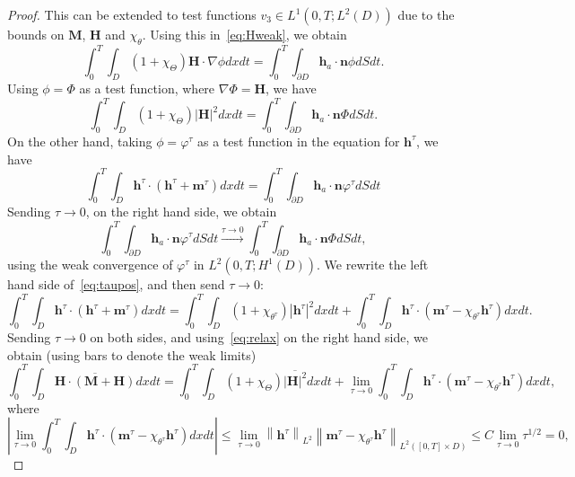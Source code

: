 \documentclass[10pt,letterpaper,twoside]{amsart}
\theoremstyle{definition}{\newtheorem{definition}[lemma]{Definition}}
\theoremstyle{note}{\newtheorem{claim}{Claim}[section]
\newtheorem*{claim*}{Claim}}
\numberwithin{equation}{section}
\newcommand{\dom}{D}
\newcommand{\norm}[1]{\left\| #1 \right\|}
\newcommand{\Grad}{\nabla}
\newcommand{\Bm}{\mathbf{M}}
\newcommand{\Bh}{\mathbf{H}}
\newcommand{\bh}{\mathbf{h}}
\newcommand{\bmt}{\mathbf{m}^{\tau}}
\newcommand{\bht}{\mathbf{h}^{\tau}}
\newcommand{\tht}{\theta^{\tau}}
\newcommand{\pht}{\varphi^{\tau}}
\begin{document}
\begin{proof}
	This can be extended to test functions $v_3\in L^1(0,T;L^2(\dom))$ due to the bounds on $\Bm$, $\Bh$ and $\chi_\theta$. Using this in~\eqref{eq:Hweak}, we obtain
		\begin{equation*}%
		\int_0^T\int_{\dom}(1+\chi_\Theta)\Bh\cdot \Grad \phi dxdt  = \int_0^T\int_{\partial\dom} \bh_a\cdot\mathbf{n} \phi dSdt . 
	\end{equation*}
	Using $\phi=\Phi$ as a test function, where $\Grad\Phi =\Bh$, we have
		\begin{equation}\label{eq:Hweak1}%
		\int_0^T\int_{\dom}(1+\chi_\Theta)|\Bh|^2  dx dt = \int_0^T\int_{\partial\dom} \bh_a\cdot \mathbf{n} \Phi dSdt . 
	\end{equation}
	On the other hand, taking $\phi=\varphi^\tau$ as a test function in the equation for $\bht$, we have
	\begin{equation}\label{eq:taupos}
		\int_0^T\int_{\dom} \bht\cdot (\bht+\bmt)dx dt = \int_0^T\int_{\partial\dom}\bh_a\cdot\mathbf{n} \pht dSdt
	\end{equation}
	Sending $\tau\to 0$, on the right hand side, we obtain 
	\begin{equation}\label{eq:taurhs}
		 \int_0^T\int_{\partial\dom}\bh_a\cdot\mathbf{n} \pht dSdt\stackrel{\tau\to 0}{\longrightarrow}  \int_0^T\int_{\partial\dom}\bh_a\cdot\mathbf{n} \Phi dSdt,
	\end{equation}
	using the weak convergence of $\pht$ in $L^2(0,T;H^1(\dom))$. We rewrite the left hand side of~\eqref{eq:taupos}, and then send $\tau\to 0$:
	\begin{equation*}
			\int_0^T\int_{\dom} \bht\cdot (\bht+\bmt)dx dt = 	\int_0^T\int_{\dom}(1+\chi_{\tht})|\bht|^2 dx dt + \int_0^T\int_{\dom} \bht\cdot (\bmt-\chi_{\tht}\bht)dx dt. 
	\end{equation*}
	Sending $\tau\to 0$ on both sides, and using~\eqref{eq:relax} on the right hand side, we obtain (using bars to denote the weak limits)
	\begin{equation*}
		\int_0^T\int_{\dom} \overline{\Bh\cdot(\Bm+\Bh)} dx dt =	\int_0^T\int_{\dom} (1+\chi_{\Theta})\overline{|\Bh|^2} dx dt +\lim_{\tau\to 0}\int_0^T\int_{\dom} \bht\cdot (\bmt-\chi_{\tht}\bht)dx dt,
	\end{equation*}
	where
	\begin{equation*}
		\left|\lim_{\tau\to 0}\int_0^T\int_{\dom} \bht\cdot (\bmt-\chi_{\tht}\bht)dx dt\right|\leq \lim_{\tau\to 0} \norm{\bht}_{L^2}\norm{\bmt-\chi_{\tht}\bht}_{L^2([0,T]\times\dom)} \leq C \lim_{\tau\to 0}\tau^{1/2}=0,
	\end{equation*}

\end{proof}
\end{document}
